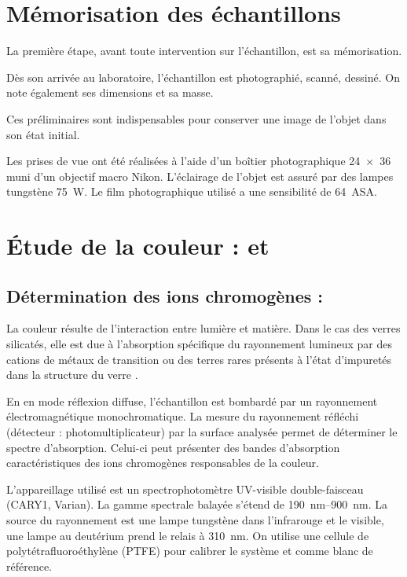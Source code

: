 \section{Mémorisation des échantillons}

La première étape, avant toute intervention sur l'échantillon, est sa 
mémorisation.

Dès son arrivée au laboratoire, l'échantillon est photographié, 
scanné, dessiné. On note également ses dimensions et sa masse.

Ces préliminaires sont indispensables pour conserver une image de 
l'objet dans son état initial.

Les prises de vue ont été réalisées à l'aide d'un boîtier 
photographique \num{24x36} muni d'un objectif macro Nikon. 
L'éclairage de l'objet est assuré par des lampes tungstène 
\SI{75}{\W}. Le film photographique utilisé a une sensibilité 
de \SI{64}{ASA}.

\section[SAO et \CHRO]
        {Étude de la couleur : \SAO et \CHRO}

\subsection[SAO]
           {Détermination des ions chromogènes : \SAO}
La couleur résulte de l'interaction entre lumière et matière. Dans le 
cas des verres silicatés, elle est due à l'absorption spécifique du 
rayonnement lumineux par des cations de métaux de transition ou des 
terres rares présents à l'état d'impuretés dans la structure du verre 
\autocite{Lajarte_1979}.

En \SAO en mode réflexion diffuse, l'échantillon est bombardé 
par un rayonnement électromagnétique monochromatique. La mesure du 
rayonnement réfléchi (détecteur : photomultiplicateur) par la surface 
analysée permet de déterminer le spectre d'absorption. Celui-ci peut 
présenter des bandes d'absorption caractéristiques des ions 
chromogènes responsables de la couleur.

L'appareillage utilisé est un spectrophotomètre UV-visible 
double-faisceau (CARY1, Varian). La gamme spectrale balayée s'étend 
de \SIrange[range-phrase=\ à\ ]{190}{900}{\nm}.
La source du rayonnement est une lampe tungstène dans l'infrarouge 
et le visible, une lampe au deutérium prend le relais à \SI{310}{\nm}. 
On utilise une cellule de polytétrafluoroéthylène (PTFE) pour calibrer 
le système et comme blanc de référence.

